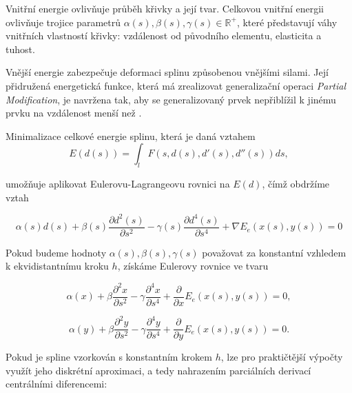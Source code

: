 \par Vnitřní energie ovlivňuje průběh křivky a její tvar. Celkovou vnitřní energii ovlivňuje trojice parametrů $\alpha(s), \beta(s), \gamma(s) \in \mathbb{R}^+$, které představují váhy vnitřních vlastností křivky: vzdálenost od původního elementu, elasticita a tuhost. 

\par Vnější energie zabezpečuje deformaci splinu způsobenou vnějšími silami. Její přidružená energetická funkce, která má zrealizovat generalizační operaci \emph{Partial Modification}, je navržena tak, aby se generalizovaný prvek nepřiblížil k jinému prvku na vzdálenost menší než . 

\par Minimalizace celkové energie splinu, která je daná vztahem
\begin{equation*}
    E(d(s)) = \int_{l}{}F(s,d(s),d'(s),d''(s))ds,
\end{equation*}
\par umožňuje aplikovat Eulerovu-Lagrangeovu rovnici na $E(d)$, čímž obdržíme vztah

\begin{equation*}
    \alpha(s)d(s) + \beta(s)\frac{\partial d^2(s)}{\partial s^2} - \gamma(s) \frac{\partial d^4(s)}{\partial s^4} + \nabla E_e(x(s),y(s)) = 0
\end{equation*}

\par Pokud budeme hodnoty $\alpha(s), \beta(s), \gamma(s)$ považovat za konstantní vzhledem k ekvidistantnímu kroku $h$, získáme Eulerovy rovnice ve tvaru

\begin{equation*}
    \alpha(x) + \beta \frac{\partial^2 x}{\partial s^2} - \gamma \frac{\partial^4 x}{\partial s^4} + \frac{\partial}{\partial x} E_e (x(s), y(s)) = 0,
\end{equation*}

\begin{equation*}
    \alpha(y) + \beta \frac{\partial^2 y}{\partial s^2} - \gamma \frac{\partial^4 y}{\partial s^4} + \frac{\partial}{\partial y} E_e (x(s), y(s)) = 0.
\end{equation*}

\par Pokud je spline vzorkován s konstantním krokem $h$, lze pro praktičtější výpočty využít jeho diskrétní aproximaci, a tedy nahrazením parciálních derivací centrálními diferencemi:

